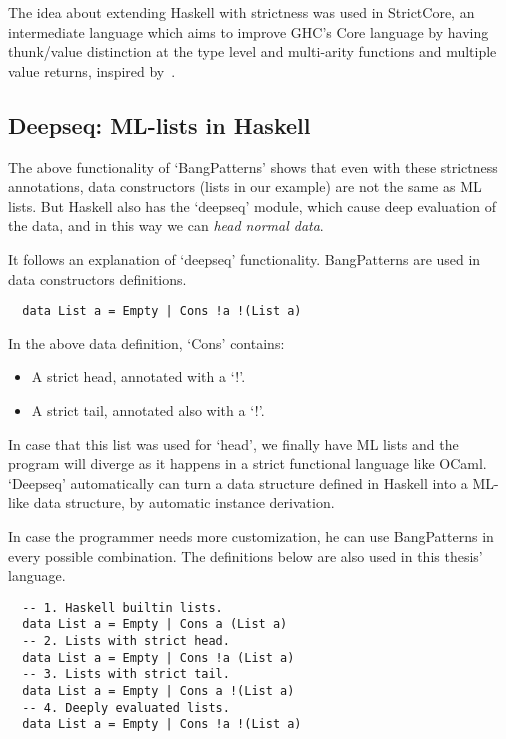\documentclass[diploma]{softlab-thesis}
\begin{document}
The idea about extending Haskell with strictness was used in StrictCore, an intermediate language 
which aims to improve GHC's Core language by having
thunk/value distinction at the type level and multi-arity functions and multiple value returns, 
inspired by~\cite{Bol09}.


\subsection{Deepseq: ML-lists in Haskell}
\label{sec:deepseq}

The above functionality of `BangPatterns' shows that even with these strictness annotations, data constructors (lists in our
example) are not the same as ML lists. But Haskell also has the `deepseq' module, which cause deep evaluation of the data, 
and in this way we can \textit{head normal data}. 

It follows an explanation of `deepseq' functionality. 
BangPatterns are used in data constructors definitions.

\begin{verbatim}
  data List a = Empty | Cons !a !(List a)
\end{verbatim}

In the above data definition, `Cons' contains:
\begin{itemize}
  \item A strict head, annotated with a `!'.
  \item A strict tail, annotated also with a `!'.
\end{itemize}

In case that this list was used for `head', we finally have ML lists and the program 
will diverge as it happens in a strict functional language like OCaml. `Deepseq' automatically can turn a data structure
defined in Haskell into a ML-like data structure, by automatic instance derivation.
\newline \newline
\par In case the programmer needs more customization, he can use BangPatterns in every possible combination. 
The definitions below are also used in this thesis' language.
\begin{verbatim}
  -- 1. Haskell builtin lists.
  data List a = Empty | Cons a (List a) 
  -- 2. Lists with strict head.
  data List a = Empty | Cons !a (List a)
  -- 3. Lists with strict tail.
  data List a = Empty | Cons a !(List a)
  -- 4. Deeply evaluated lists. 
  data List a = Empty | Cons !a !(List a)
\end{verbatim}
\end{document}
